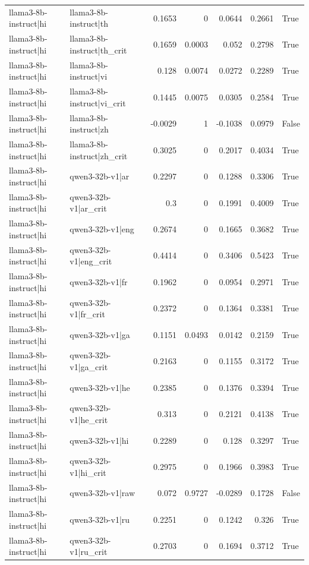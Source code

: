 \begin{table}
\begin{tabular}{l l r r r r l}
llama3-8b-instruct|hi & llama3-8b-instruct|th & 0.1653 & 0 & 0.0644 & 0.2661 & True \\
llama3-8b-instruct|hi & llama3-8b-instruct|th_crit & 0.1659 & 0.0003 & 0.052 & 0.2798 & True \\
llama3-8b-instruct|hi & llama3-8b-instruct|vi & 0.128 & 0.0074 & 0.0272 & 0.2289 & True \\
llama3-8b-instruct|hi & llama3-8b-instruct|vi_crit & 0.1445 & 0.0075 & 0.0305 & 0.2584 & True \\
llama3-8b-instruct|hi & llama3-8b-instruct|zh & -0.0029 & 1 & -0.1038 & 0.0979 & False \\
llama3-8b-instruct|hi & llama3-8b-instruct|zh_crit & 0.3025 & 0 & 0.2017 & 0.4034 & True \\
llama3-8b-instruct|hi & qwen3-32b-v1|ar & 0.2297 & 0 & 0.1288 & 0.3306 & True \\
llama3-8b-instruct|hi & qwen3-32b-v1|ar_crit & 0.3 & 0 & 0.1991 & 0.4009 & True \\
llama3-8b-instruct|hi & qwen3-32b-v1|eng & 0.2674 & 0 & 0.1665 & 0.3682 & True \\
llama3-8b-instruct|hi & qwen3-32b-v1|eng_crit & 0.4414 & 0 & 0.3406 & 0.5423 & True \\
llama3-8b-instruct|hi & qwen3-32b-v1|fr & 0.1962 & 0 & 0.0954 & 0.2971 & True \\
llama3-8b-instruct|hi & qwen3-32b-v1|fr_crit & 0.2372 & 0 & 0.1364 & 0.3381 & True \\
llama3-8b-instruct|hi & qwen3-32b-v1|ga & 0.1151 & 0.0493 & 0.0142 & 0.2159 & True \\
llama3-8b-instruct|hi & qwen3-32b-v1|ga_crit & 0.2163 & 0 & 0.1155 & 0.3172 & True \\
llama3-8b-instruct|hi & qwen3-32b-v1|he & 0.2385 & 0 & 0.1376 & 0.3394 & True \\
llama3-8b-instruct|hi & qwen3-32b-v1|he_crit & 0.313 & 0 & 0.2121 & 0.4138 & True \\
llama3-8b-instruct|hi & qwen3-32b-v1|hi & 0.2289 & 0 & 0.128 & 0.3297 & True \\
llama3-8b-instruct|hi & qwen3-32b-v1|hi_crit & 0.2975 & 0 & 0.1966 & 0.3983 & True \\
llama3-8b-instruct|hi & qwen3-32b-v1|raw & 0.072 & 0.9727 & -0.0289 & 0.1728 & False \\
llama3-8b-instruct|hi & qwen3-32b-v1|ru & 0.2251 & 0 & 0.1242 & 0.326 & True \\
llama3-8b-instruct|hi & qwen3-32b-v1|ru_crit & 0.2703 & 0 & 0.1694 & 0.3712 & True \\

\end{tabular}
\end{table}
